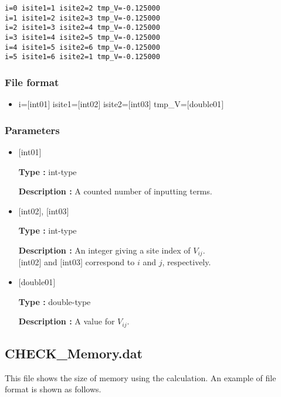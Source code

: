 \begin{minipage}{12.5cm}
\begin{screen}
\begin{verbatim}
i=0 isite1=1 isite2=2 tmp_V=-0.125000 
i=1 isite1=2 isite2=3 tmp_V=-0.125000 
i=2 isite1=3 isite2=4 tmp_V=-0.125000 
i=3 isite1=4 isite2=5 tmp_V=-0.125000 
i=4 isite1=5 isite2=6 tmp_V=-0.125000 
i=5 isite1=6 isite2=1 tmp_V=-0.125000 
\end{verbatim}
\end{screen}
\end{minipage}

\subsubsection{File format}
 \begin{itemize}
   \item  i=$[$int01$]$ isite1=$[$int02$]$ isite2=$[$int03$]$ tmp\_V=$[$double01$]$ 
 \end{itemize}
 
\subsubsection{Parameters}
 \begin{itemize}

    \item  $[$int01$]$ 
   
    {\bf Type :} int-type

   {\bf Description :} A counted number of inputting terms.
      
   \item  $[$int02$]$, $[$int03$]$
   
    {\bf Type :} int-type

    {\bf Description :}  An integer giving a site index of $V_{ij}$. \\
    $[$int02$]$ and $[$int03$]$ correspond to $i$ and $j$, respectively.
 
   \item  $[$double01$]$ 
   
    {\bf Type :} double-type

   {\bf Description :} A value for $V_{ij}$.
\end{itemize}


\newpage
\subsection{CHECK\_Memory.dat}
This file shows the size of memory using the calculation.
An example of file format is shown as follows.


